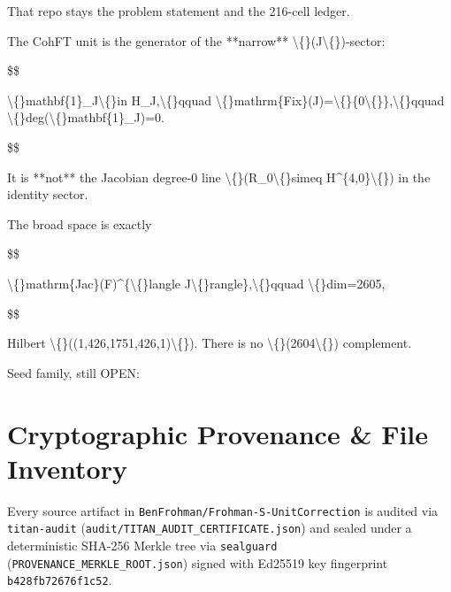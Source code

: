 \documentclass[11pt,a4paper]{article}
\begin{document}
That repo stays the problem statement and the 216-cell ledger.

The CohFT unit is the generator of the **narrow** \textbackslash\{\}(J\textbackslash\{\})-sector:

\$\$

\textbackslash\{\}mathbf\{1\}\_J\textbackslash\{\}in H\_J,\textbackslash\{\}qquad \textbackslash\{\}mathrm\{Fix\}(J)=\textbackslash\{\}\{0\textbackslash\{\}\},\textbackslash\{\}qquad \textbackslash\{\}deg(\textbackslash\{\}mathbf\{1\}\_J)=0.

\$\$

It is **not** the Jacobian degree-0 line \textbackslash\{\}(R\_0\textbackslash\{\}simeq H\textasciicircum{}\{4,0\}\textbackslash\{\}) in the identity sector.

The broad space is exactly

\$\$

\textbackslash\{\}mathrm\{Jac\}(F)\textasciicircum{}\{\textbackslash\{\}langle J\textbackslash\{\}rangle\},\textbackslash\{\}qquad \textbackslash\{\}dim=2605,

\$\$

Hilbert \textbackslash\{\}((1,426,1751,426,1)\textbackslash\{\}). There is no \textbackslash\{\}(2604\textbackslash\{\}) complement.

Seed family, still OPEN:

\section{Cryptographic Provenance \& File Inventory}
Every source artifact in \texttt{BenFrohman/Frohman-S-UnitCorrection} is audited via \texttt{titan-audit}
(\texttt{audit/TITAN\_AUDIT\_CERTIFICATE.json}) and sealed under a deterministic SHA-256 Merkle tree via
\texttt{sealguard} (\texttt{PROVENANCE\_MERKLE\_ROOT.json}) signed with Ed25519 key fingerprint
\texttt{b428fb72676f1c52}.
\end{document}
